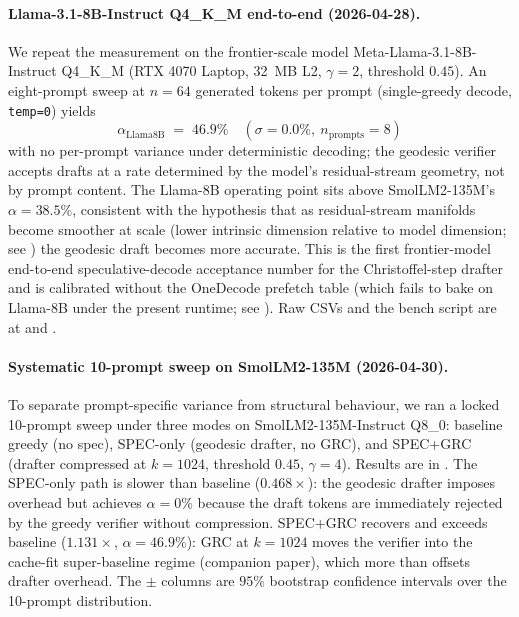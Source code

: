 \documentclass[11pt]{article}
\begin{document}
\paragraph{Llama-3.1-8B-Instruct Q4\_K\_M end-to-end (2026-04-28).}
We repeat the measurement on the frontier-scale model
Meta-Llama-3.1-8B-Instruct Q4\_K\_M (RTX 4070 Laptop, 32~MB L2,
$\gamma{=}2$, threshold $0.45$).  An eight-prompt sweep at $n{=}64$
generated tokens per prompt (single-greedy decode, \texttt{temp=0}) yields
\[
\alpha_\text{Llama8B} \;=\; 46.9\%\quad
(\sigma\!=\!0.0\%,\ n_\text{prompts}{=}8)
\]
with no per-prompt variance under deterministic decoding;
the geodesic verifier accepts drafts at a rate determined by the
model's residual-stream geometry, not by prompt content.
The Llama-8B operating point sits above SmolLM2-135M's
$\alpha{=}38.5\%$, consistent with the hypothesis that as residual-stream
manifolds become smoother at scale (lower intrinsic dimension relative
to model dimension; see ) the geodesic draft becomes more
accurate.  This is the first frontier-model end-to-end speculative-decode
acceptance number for the Christoffel-step drafter and is calibrated
without the OneDecode prefetch table (which fails to bake on Llama-8B
under the present runtime; see ).
Raw CSVs and the bench script are at
 and
.

\paragraph{Systematic 10-prompt sweep on SmolLM2-135M (2026-04-30).}
To separate prompt-specific variance from structural behaviour, we ran a
locked 10-prompt sweep under three modes on SmolLM2-135M-Instruct Q8\_0:
baseline greedy (no spec), SPEC-only (geodesic drafter, no GRC), and
SPEC+GRC (drafter compressed at $k{=}1024$, threshold $0.45$,
$\gamma{=}4$).  Results are in .
The SPEC-only path is slower than baseline ($0.468\times$): the
geodesic drafter imposes overhead but achieves $\alpha{=}0\%$
because the draft tokens are immediately rejected by the greedy
verifier without compression.  SPEC+GRC recovers and exceeds baseline
($1.131\times$, $\alpha{=}46.9\%$): GRC at $k{=}1024$ moves the verifier
into the cache-fit super-baseline regime (companion paper), which
more than offsets drafter overhead.  The $\pm$ columns are $95\%$
bootstrap confidence intervals over the 10-prompt distribution.
\end{document}

